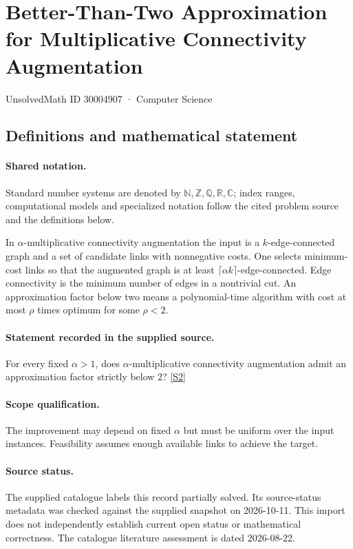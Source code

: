 \documentclass[11pt]{article}
\newcommand{\sref}[2]{\hyperlink{source:#1:#2}{[S#2]}}
\begin{document}
\setcounter{section}{30004906}
\section{Better-Than-Two Approximation for Multiplicative Connectivity Augmentation}\label{30004907}
{\small\sffamily UnsolvedMath ID 30004907 · Computer Science}
\subsection{Definitions and mathematical statement}

\paragraph{Shared notation.}Standard number systems are denoted by $\mathbb N,\mathbb Z,\mathbb Q,\mathbb R,\mathbb C$; index ranges, computational models and specialized notation follow the cited problem source and the definitions below.


In $\alpha$-multiplicative connectivity augmentation the input is a $k$-edge-connected graph and a set of candidate links with nonnegative costs. One selects minimum-cost links so that the augmented graph is at least $\lceil\alpha k\rceil$-edge-connected. Edge connectivity is the minimum number of edges in a nontrivial cut. An approximation factor below two means a polynomial-time algorithm with cost at most $\rho$ times optimum for some $\rho<2$.
\paragraph{Statement recorded in the supplied source.}
For every fixed $\alpha>1$, does $\alpha$-multiplicative connectivity augmentation admit an approximation factor strictly below $2$? \sref{30004907}{2}
\paragraph{Scope qualification.}
The improvement may depend on fixed $\alpha$ but must be uniform over the input instances. Feasibility assumes enough available links to achieve the target.
\paragraph{Source status.}
The supplied catalogue labels this record partially solved. Its source-status metadata was checked against the supplied snapshot on 2026-10-11. This import does not independently establish current open status or mathematical correctness. The catalogue literature assessment is dated 2026-08-22.
\end{document}

